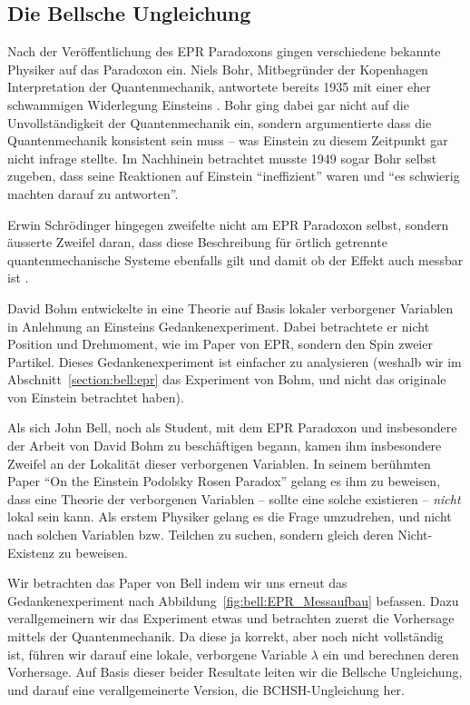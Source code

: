 \begin{refsection}
\section{Die Bellsche Ungleichung\label{section:bell:bell}}
Nach der Ver\"offentlichung des EPR Paradoxons gingen verschiedene bekannte
Physiker auf das Paradoxon ein.
Niels Bohr, Mitbegr\"under der Kopenhagen Interpretation der Quantenmechanik,
antwortete bereits 1935 mit einer eher schwammigen Widerlegung Einsteins
\cite{Bell:Bohr1935}.
Bohr ging dabei gar nicht auf die Unvollst\"andigkeit der Quantenmechanik ein,
sondern argumentierte dass die Quantenmechanik konsistent sein muss -- was
Einstein zu diesem Zeitpunkt gar nicht infrage stellte.
Im Nachhinein betrachtet musste 1949 sogar Bohr selbst zugeben, dass seine
Reaktionen auf Einstein \enquote{ineffizient} waren und 
\enquote{es schwierig machten darauf zu antworten}. 

Erwin Schr\"odinger hingegen zweifelte nicht am EPR Paradoxon selbst, sondern
\"ausserte Zweifel daran, dass diese Beschreibung f\"ur \"ortlich getrennte
quantenmechanische Systeme ebenfalls gilt und damit ob der Effekt auch
messbar ist \cite{Bell:Schroedinger1936}.

David Bohm entwickelte in \cite{Bell:Bohm1952} eine Theorie auf Basis
lokaler verborgener Variablen in Anlehnung an Einsteins Gedankenexperiment.
Dabei betrachtete er nicht  Position und Drehmoment, wie im Paper von EPR,
sondern den Spin zweier Partikel.
Dieses Gedankenexperiment ist einfacher zu analysieren (weshalb wir im
Abschnitt~\ref{section:bell:epr} das Experiment von Bohm, und nicht das
originale von Einstein betrachtet haben).

Als sich John Bell, noch als Student, mit dem EPR Paradoxon und insbesondere
der Arbeit von David Bohm zu besch\"aftigen begann, kamen ihm insbesondere
Zweifel an der Lokalit\"at dieser verborgenen Variablen.
In seinem ber\"uhmten Paper
\enquote{On the Einstein Podolsky Rosen Paradox} \cite{Bell:Bell1964}
gelang es ihm zu beweisen, dass eine Theorie der verborgenen Variablen -- sollte
eine solche existieren -- \emph{nicht} lokal sein kann.
Als erstem Physiker gelang es die Frage umzudrehen, und nicht nach solchen
Variablen bzw. Teilchen zu suchen, sondern gleich deren Nicht-Existenz
zu beweisen.

Wir betrachten das Paper von Bell indem wir uns erneut das Gedankenexperiment 
nach Abbildung~\ref{fig:bell:EPR_Messaufbau} befassen.
Dazu verallgemeinern wir das Experiment etwas und betrachten zuerst die
Vorhersage mittels der Quantenmechanik.
Da diese ja korrekt, aber noch nicht vollst\"andig ist, f\"uhren wir darauf
eine lokale, verborgene Variable $\lambda$ ein und berechnen deren Vorhersage.
Auf Basis dieser beider Resultate leiten wir die Bellsche Ungleichung, und
darauf eine verallgemeinerte Version, die BCHSH-Ungleichung her.


\end{refsection}
